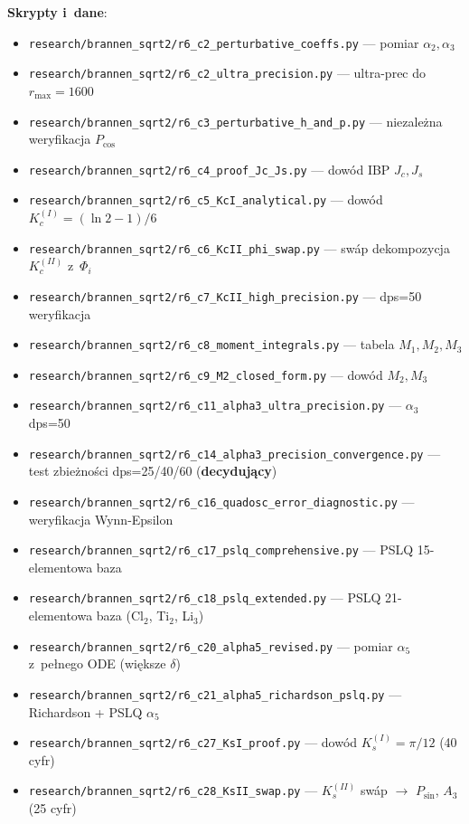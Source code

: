 \medskip
\textbf{Skrypty i~dane}:
\begin{itemize}
\item \texttt{research/brannen\_sqrt2/r6\_c2\_perturbative\_coeffs.py} --- pomiar $\alpha_2, \alpha_3$
\item \texttt{research/brannen\_sqrt2/r6\_c2\_ultra\_precision.py} --- ultra-prec do $r_{\max}=1600$
\item \texttt{research/brannen\_sqrt2/r6\_c3\_perturbative\_h\_and\_p.py} --- niezale\.zna weryfikacja $P_{\cos}$
\item \texttt{research/brannen\_sqrt2/r6\_c4\_proof\_Jc\_Js.py} --- dow\'od IBP $J_c, J_s$
\item \texttt{research/brannen\_sqrt2/r6\_c5\_KcI\_analytical.py} --- dow\'od $K_c^{(I)} = (\ln 2 - 1)/6$
\item \texttt{research/brannen\_sqrt2/r6\_c6\_KcII\_phi\_swap.py} --- sw\'ap dekompozycja $K_c^{(II)}$ z~$\Phi_i$
\item \texttt{research/brannen\_sqrt2/r6\_c7\_KcII\_high\_precision.py} --- dps=50 weryfikacja
\item \texttt{research/brannen\_sqrt2/r6\_c8\_moment\_integrals.py} --- tabela $M_1, M_2, M_3$
\item \texttt{research/brannen\_sqrt2/r6\_c9\_M2\_closed\_form.py} --- dow\'od $M_2, M_3$
\item \texttt{research/brannen\_sqrt2/r6\_c11\_alpha3\_ultra\_precision.py} --- $\alpha_3$ dps=50
\item \texttt{research/brannen\_sqrt2/r6\_c14\_alpha3\_precision\_convergence.py} --- test zbie\.zno\'sci dps=25/40/60 (\textbf{decyduj\k{a}cy})
\item \texttt{research/brannen\_sqrt2/r6\_c16\_quadosc\_error\_diagnostic.py} --- weryfikacja Wynn-Epsilon
\item \texttt{research/brannen\_sqrt2/r6\_c17\_pslq\_comprehensive.py} --- PSLQ 15-elementowa baza
\item \texttt{research/brannen\_sqrt2/r6\_c18\_pslq\_extended.py} --- PSLQ 21-elementowa baza (Cl$_2$, Ti$_2$, Li$_3$)
\item \texttt{research/brannen\_sqrt2/r6\_c20\_alpha5\_revised.py} --- pomiar $\alpha_5$ z~pe\l{}nego ODE (wi\k{e}ksze $\delta$)
\item \texttt{research/brannen\_sqrt2/r6\_c21\_alpha5\_richardson\_pslq.py} --- Richardson + PSLQ $\alpha_5$
\item \texttt{research/brannen\_sqrt2/r6\_c27\_KsI\_proof.py} --- dow\'od $K_s^{(I)} = \pi/12$ (40 cyfr)
\item \texttt{research/brannen\_sqrt2/r6\_c28\_KsII\_swap.py} --- $K_s^{(II)}$ sw\'ap $\to$ $P_{\sin}$, $A_3$ (25 cyfr)

\end{itemize}
